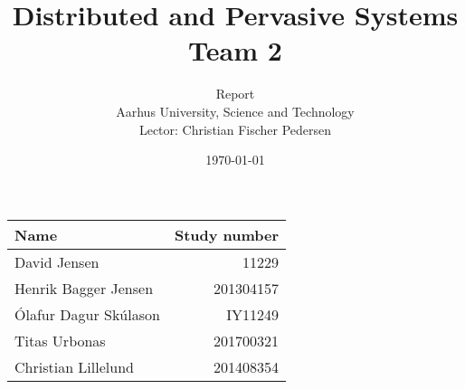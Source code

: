 \documentclass[a4paper,10pt,oneside]{memoir}
\title{Distributed and Pervasive Systems \\ Team 2}
\author{Report \\ Aarhus University, Science and Technology \\ Lector: Christian Fischer Pedersen}
\date{\today}
\begin{document}
\fancyhf{} %
\frontmatter
\maketitle
\vfill


\begin{table} [h]
	\centering
	\begin{tabular}{|l|r|}
	\hline 
	\textbf{Name} 				& \textbf{Study number}	\\ \hline
	David Jensen 				& 11229 	  			\\ \hline
	Henrik Bagger Jensen 		& 201304157  			\\ \hline
	Ólafur Dagur Skúlason 		& IY11249	 			\\ \hline
	Titas Urbonas 				& 201700321  			\\ \hline
	Christian Lillelund 		& 201408354 			\\ \hline

	\end{tabular}
\end{table}

\vfill

\clearpage
\pagestyle{plain}

\tableofcontents

\vfill

\mainmatter
\pagestyle{fancy}
\fancyhf{} %
\fancyhead[CE,CO]{\nouppercase{\leftmark}}
\fancyfoot[CO,CE]{\nouppercase{\rightmark}}
\fancyfoot[LE,RO]{\thepage}

				\clearpage
	\clearpage
		\clearpage
		\clearpage
					\clearpage
				\clearpage
			\clearpage
			\clearpage
				\clearpage
				    \clearpage
				    \clearpage
				\clearpage

\end{document}
